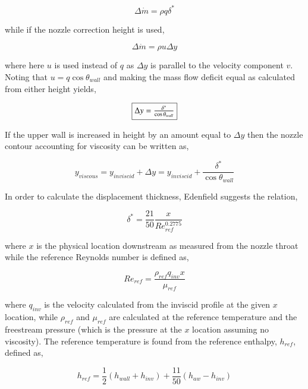 \begin{displaymath}
	\Delta \dot{m} = \rho q \delta^*
\end{displaymath}
	
	while if the nozzle correction height is used,

\begin{displaymath}
	\Delta \dot{m} = \rho u \Delta y
\end{displaymath}

	where here $u$ is used instead of $q$ as $\Delta y$ is parallel to the velocity
component $v$.  Noting that $u = q\cos\theta_{wall}$ and making the mass flow deficit equal as calculated
from either height yields,

\begin{equation}
	\fbox{$
	\Delta y = \frac{\delta^*}{\cos\theta_{wall}}
	$}
\label{eqn:deltay}
\end{equation}

  If the upper wall is increased in height by an amount equal to $\Delta y$ then the nozzle contour 
accounting for viscosity can be written as,

\begin{equation}
	y_{viscous} = y_{inviscid} + \Delta y = y_{inviscid} + \frac{\delta^*}{\cos\theta_{wall}}
\label{eqn:yvis}
\end{equation}

	In order to calculate the displacement thickness, Edenfield suggests the relation,

\begin{equation}
	\delta^* = \frac{21}{50}\frac{x}{Re_{ref}^{0.2775}} 
\label{eqn:dispthick}
\end{equation}	

	where $x$ is the physical location downstream as measured from the nozzle throat while the 
reference Reynolds number is defined as,

\begin{equation}
	Re_{ref}=\frac{\rho_{ref}q_{inv}x}{\mu_{ref}}
\label{eqn:reyref}
\end{equation}

	where $q_{inv}$ is the velocity calculated from the inviscid profile at the given $x$ location,
while $\rho_{ref}$ and $\mu_{ref}$ are calculated at the reference temperature and the freestream pressure
(which is the pressure at the $x$ location assuming no viscosity).  The reference temperature is
found from the reference enthalpy, $h_{ref}$, defined as,

\begin{equation}
	h_{ref}=\frac{1}{2}(h_{wall} + h_{inv}) + \frac{11}{50}(h_{aw} - h_{inv})
\label{eqn:href}
\end{equation}


